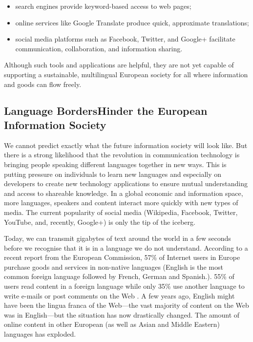 \begin{multicols}{2}
\begin{itemize}
      \item search engines provide keyword-based access to web pages;
      \item online services like Google Translate produce quick, approximate translations;
      \item social media platforms such as Facebook, Twitter, and Google+ facilitate communication, collaboration, and information sharing.
    \end{itemize}
    Although such tools and applications are helpful, they are not yet capable of supporting a sustainable, multilingual European society for all where information and goods can flow freely.

\subsection[Language Borders Hinder the European Information Society]{Language Borders\newline Hinder the European Information Society}

    We cannot predict exactly what the future information society will look like. But there is a strong likelihood that the revolution in communication technology is bringing people speaking different languages together in new ways. This is putting pressure on individuals to learn new languages and especially on developers to create new technology applications to ensure mutual understanding and access to shareable knowledge. In a global economic and information space, more languages, speakers and content interact more quickly with new types of media. The current popularity of social media (Wikipedia, Facebook, Twitter, YouTube, and, recently, Google+) is only the tip of the iceberg.

   
    Today, we can transmit gigabytes of text around the world in a few seconds before we recognise that it is in a language we do not understand. According to a recent report from the European Commission, 57\% of Internet users in Europe purchase goods and services in non-native languages (English is the most common foreign language followed by French, German and Spanish.). 55\% of users read content in a foreign language while only 35\% use another language to write e-mails or post comments on the Web \cite{BAS-Nota1}. A few years ago, English might have been the lingua franca of the Web—the vast majority of content on the Web was in English—but the situation has now drastically changed. The amount of online content in other European (as well as Asian and Middle Eastern) languages has exploded.


\end{multicols}
